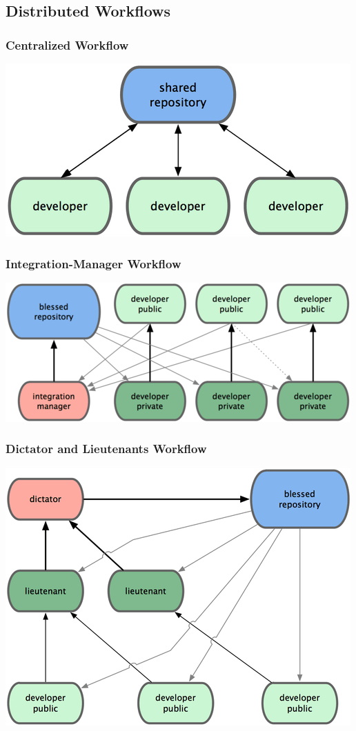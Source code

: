 \documentclass[english,compress]{beamer}
\begin{document}
\subsection{Distributed Workflows}
\frame
{
    \frametitle{Centralized Workflow}

    \begin{center}
        \includegraphics[width=.7\textwidth]{figs/centralized-workflow.png}\cite{book}
    \end{center}
}

\frame
{
    \frametitle{Integration-Manager Workflow}

    \begin{center}
        \includegraphics[width=.7\textwidth]{figs/integration-manager-workflow.png}\cite{book}
    \end{center}

}

\frame
{
    \frametitle{Dictator and Lieutenants Workflow}

    \begin{center}
        \includegraphics[width=.7\textwidth]{figs/dictator-lieutenant-workflow.png}\cite{book}
    \end{center}

}
\end{document}
